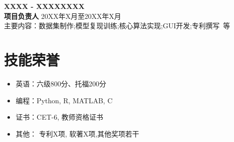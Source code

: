     \vspace{0.5em}
    {\large{\textbf{XXXX - XXXXXXXX}}} \\ \textbf{项目负责人} \hfill {20XX年X月至20XX年X月}\\
    主要内容：数据集制作;模型复现训练;核心算法实现;GUI开发;专利撰写\ 等

    \section{\makebox[\widthof{\faWrench}][c]{\color{SWU_Blue}{\faWrench}}\quad 技能荣誉 }
    \vspace{0.5em}
    \begin{itemize}
        \item 英语：六级800分、托福200分
        \item 编程：Python, R, MATLAB, C
        \item 证书：CET-6, 教师资格证书
        \item 其他： 专利X项, 软著X项,其他奖项若干
    \end{itemize}
    


    
    
